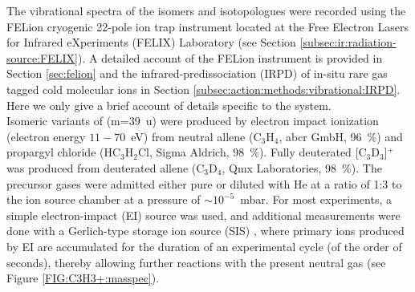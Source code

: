 The vibrational spectra of the \iso isomers and isotopologues were recorded using the FELion cryogenic 22-pole ion trap instrument located at the Free Electron Lasers for Infrared eXperiments (FELIX) Laboratory (see Section \ref{subsec:ir:radiation-source:FELIX}). A detailed account of the FELion instrument is provided in Section \ref{sec:felion} and the infrared-predissociation (IRPD) of in-situ rare gas tagged cold molecular ions in Section \ref{subsec:action:methods:vibrational:IRPD}. Here we only give a brief account of details specific to the \iso system. \\

Isomeric variants of \iso (m=39~u) were produced by electron impact ionization (electron energy $11-70$~eV) from neutral allene (C$_3$H$_4$, abcr GmbH, 96~\%)  and propargyl chloride (HC$_3$H$_2$Cl, Sigma Aldrich, 98~\%). Fully deuterated [C$_3$D$_3$]$^+$ was produced from deuterated allene (C$_3$D$_4$, Qmx Laboratories, 98~\%). The precursor gases were admitted either pure or diluted with He at a ratio of 1:3 to the ion source chamber at a pressure of $\sim 10^{-5}$~mbar. For most experiments, a simple electron-impact (EI) source was used, and additional measurements were done with a Gerlich-type storage ion source (SIS) \cite{Gerlich1992}, where primary ions produced by EI are accumulated for the duration of an experimental cycle (of the order of seconds), thereby allowing further reactions with the present neutral gas (see Figure \ref{FIG:C3H3+:masspec}).\\

